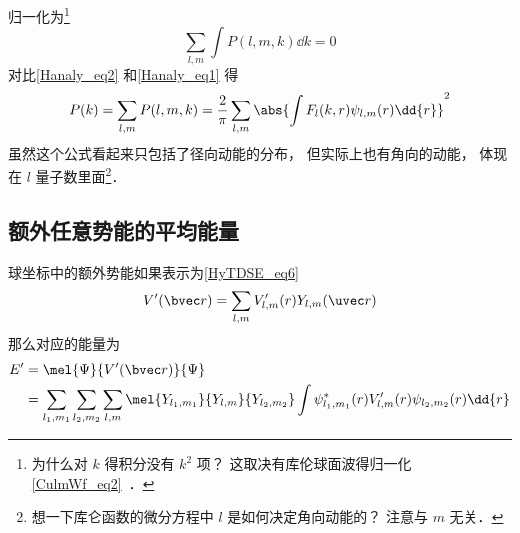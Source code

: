 归一化为\footnote{为什么对 $k$ 得积分没有 $k^2$ 项？ 这取决有库伦球面波得归一化\autoref{CulmWf_eq2}~．}
\begin{equation}
\sum_{l,m} \int P(l, m, k) \dd{k} = 0
\end{equation}
对比\autoref{Hanaly_eq2} 和\autoref{Hanaly_eq1} 得
\begin{equation}
P(k) = \sum_{l,m} P(l, m, k) = \frac{2}{\pi} \sum_{l,m} \abs{\int F_l(k, r) \psi_{l,m}(r) \dd{r}}^2
\end{equation}
虽然这个公式看起来只包括了径向动能的分布， 但实际上也有角向的动能， 体现在 $l$ 量子数里面\footnote{想一下库仑函数的微分方程中 $l$ 是如何决定角向动能的？ 注意与 $m$ 无关．}．

\subsection{额外任意势能的平均能量}
球坐标中的额外势能如果表示为\autoref{HyTDSE_eq6}~
\begin{equation}
V'(\bvec r) = \sum_{l,m} V'_{l,m}(r) Y_{l,m}(\uvec r)
\end{equation}
那么对应的能量为
\begin{equation}
\begin{aligned}
E' &= \mel{\Psi}{V'(\bvec r)}{\Psi}\\
&= \sum_{l_1,m_1}\sum_{l_2,m_2}\sum_{l,m} \mel{Y_{l_1,m_1}}{Y_{l,m}}{Y_{l_2,m_2}} \int \psi_{l_1,m_1}^*(r) V'_{l,m}(r) \psi_{l_2,m_2}(r) \dd{r}
\end{aligned}
\end{equation}
